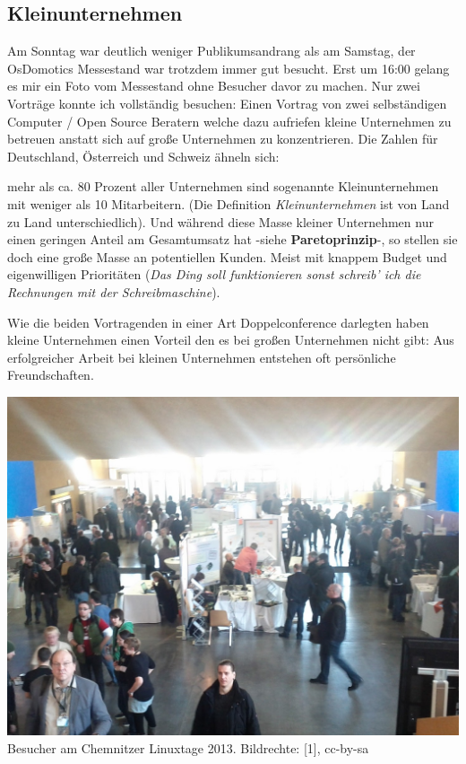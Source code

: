 \subsection*{Kleinunternehmen}

Am Sonntag war deutlich weniger Publikumsandrang als am Samstag, der OsDomotics Messestand war trotzdem immer gut besucht. Erst um 16:00 gelang es mir ein Foto vom Messestand ohne Besucher davor zu machen. Nur zwei Vorträge konnte ich vollständig besuchen: Einen Vortrag von zwei selbständigen Computer / Open Source Beratern welche dazu aufriefen kleine Unternehmen zu betreuen anstatt sich auf große Unternehmen zu konzentrieren. Die Zahlen für Deutschland, Österreich und Schweiz ähneln sich: 

mehr als ca. 80 Prozent aller Unternehmen sind sogenannte Kleinunternehmen mit weniger als 10 Mitarbeitern. (Die Definition \textit{Kleinunternehmen} ist von Land zu Land unterschiedlich). Und während diese Masse kleiner Unternehmen nur einen geringen Anteil am Gesamtumsatz hat -siehe \textbf{Paretoprinzip}-, so stellen sie doch eine große Masse an potentiellen Kunden. Meist mit knappem Budget und eigenwilligen Prioritäten (\textit{Das Ding soll funktionieren sonst schreib' ich die Rechnungen mit der Schreibmaschine}). 

Wie die beiden Vortragenden in einer Art Doppelconference darlegten haben kleine Unternehmen einen Vorteil den es bei großen Unternehmen nicht gibt: Aus erfolgreicher Arbeit bei kleinen Unternehmen entstehen oft persönliche Freundschaften.

\begin{center}
\includegraphics[width=\linewidth]{chemnitz_messe.jpg}
\footnotesize{Besucher am Chemnitzer Linuxtage 2013. Bildrechte: [1], cc-by-sa}
\end{center}

